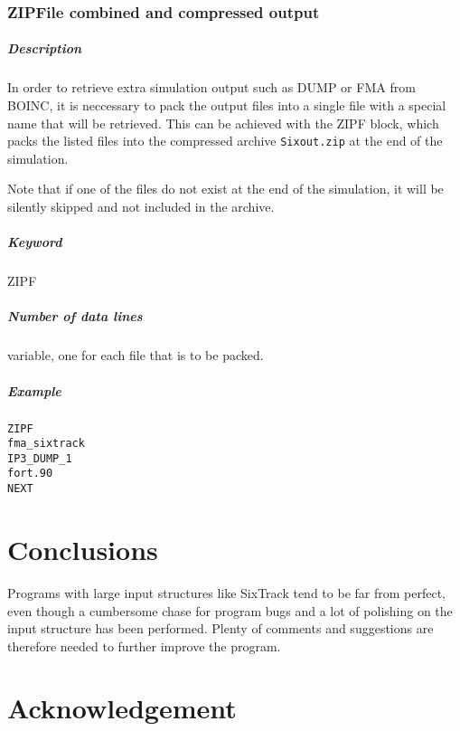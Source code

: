 \documentclass[a4paper,11pt]{report}
\begin{document}
\subsection{ZIPFile combined and compressed output}
\label{sec:ZIPF}

\paragraph{Description}
In order to retrieve extra simulation output such as DUMP or FMA from BOINC, it is neccessary to pack the output files into a single file with a special name that will be retrieved.
This can be achieved with the ZIPF block, which packs the listed files into the compressed archive \texttt{Sixout.zip} at the end of the simulation.

Note that if one of the files do not exist at the end of the simulation, it will be silently skipped and not included in the archive.

\paragraph{Keyword}
ZIPF

\paragraph{Number of data lines}
variable, one for each file that is to be packed.

\paragraph{Example}
\begin{verbatim}
ZIPF
fma_sixtrack
IP3_DUMP_1
fort.90
NEXT
\end{verbatim}

\chapter*{Conclusions}

Programs with large input structures like SixTrack tend to be far from
perfect, even though a cumbersome chase for program bugs and a lot of
polishing on the input structure has been performed.  Plenty of
comments and suggestions are therefore needed to further improve the
program.

\chapter{Acknowledgement}
\end{document}
